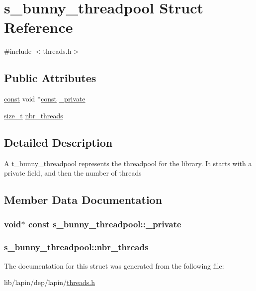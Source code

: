 \hypertarget{structs__bunny__threadpool}{\section{s\-\_\-bunny\-\_\-threadpool Struct Reference}
\label{structs__bunny__threadpool}
}


{\ttfamily \#include $<$threads.\-h$>$}

\subsection*{Public Attributes}
\begin{DoxyCompactItemize}
\item 
\hyperlink{term__entry_8h_a57bd63ce7f9a353488880e3de6692d5a}{const} void $\ast$\hyperlink{term__entry_8h_a57bd63ce7f9a353488880e3de6692d5a}{const} \hyperlink{structs__bunny__threadpool_ab6844baafa5ff665babab60dbb9fa9b8}{\-\_\-private}
\item 
\hyperlink{nc__alloc_8h_a7b60c5629e55e8ec87a4547dd4abced4}{size\-\_\-t} \hyperlink{structs__bunny__threadpool_a7df205fb3540c63c2024f0fef94ba899}{nbr\-\_\-threads}
\end{DoxyCompactItemize}


\subsection{Detailed Description}
A t\-\_\-bunny\-\_\-threadpool represents the threadpool for the library. It starts with a private field, and then the number of threads 

\subsection{Member Data Documentation}
\hypertarget{structs__bunny__threadpool_ab6844baafa5ff665babab60dbb9fa9b8}{
\subsubsection[{\-\_\-private}]{ void$\ast$ {\bf const} s\-\_\-bunny\-\_\-threadpool\-::\-\_\-private}}\label{structs__bunny__threadpool_ab6844baafa5ff665babab60dbb9fa9b8}
\hypertarget{structs__bunny__threadpool_a7df205fb3540c63c2024f0fef94ba899}{
\subsubsection[{nbr\-\_\-threads}]{ s\-\_\-bunny\-\_\-threadpool\-::nbr\-\_\-threads}}\label{structs__bunny__threadpool_a7df205fb3540c63c2024f0fef94ba899}


The documentation for this struct was generated from the following file\-:\begin{DoxyCompactItemize}
\item 
lib/lapin/dep/lapin/\hyperlink{threads_8h}{threads.\-h}\end{DoxyCompactItemize}
